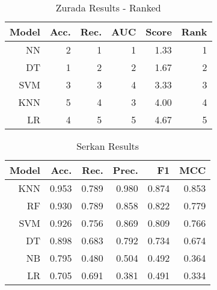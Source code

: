 \begin{table}[H]
    \small
    \setlength{\tabcolsep}{8pt}
    \renewcommand{\arraystretch}{1.3}
    \centering
    \caption[Zurada Results - Ranked]{Zurada Results - Ranked}\label{tab:zuradaresultsranks}
    \begin{tabular}{r r r r r r}
    \toprule
    Model & Acc. & Rec. & AUC & Score & Rank \\
    \midrule
    \hline
    NN & 2 & 1 & 1 & 1.33 & 1 \\ 
    DT & 1 & 2 & 2 & 1.67 & 2 \\ 
    SVM & 3 & 3 & 4 & 3.33 & 3 \\ 
    KNN & 5 & 4 & 3 & 4.00 & 4 \\ 
    LR & 4 & 5 & 5 & 4.67 & 5 \\ 
    \hline
    \bottomrule
    \end{tabular}
    \vspace{0.35em}
    
    \vspace{-1em}
\end{table}

\begin{table}[H]
    \small
    \setlength{\tabcolsep}{8pt}
    \renewcommand{\arraystretch}{1.3}
    \centering
    \caption[Serkan Results]{Serkan Results}\label{tab:serkanresults}
    \begin{tabular}{r r r r r r}
    \toprule
    Model & Acc. & Rec. & Prec. & F1 & MCC \\
    \midrule
    \hline
	
	KNN & 0.953 & 0.789 & 0.980 & 0.874 & 0.853 \\
    RF & 0.930 & 0.789 & 0.858 & 0.822 & 0.779 \\
    SVM & 0.926 & 0.756 & 0.869 & 0.809 & 0.766 \\
    DT & 0.898 & 0.683 & 0.792 & 0.734 & 0.674 \\
    NB & 0.795 & 0.480 & 0.504 & 0.492 & 0.364 \\
	LR & 0.705 & 0.691 & 0.381 & 0.491 & 0.334 \\
	
    \hline
    \bottomrule
    \end{tabular}
    \vspace{0.35em}
    
    \vspace{-1em}
\end{table}

